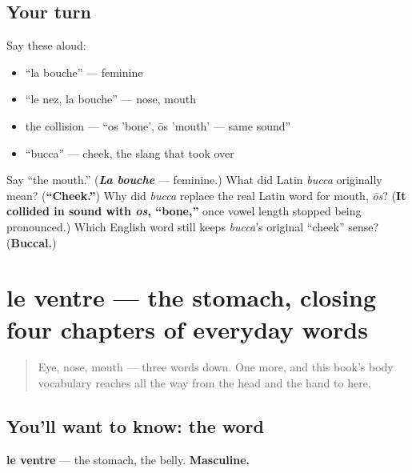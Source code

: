 \subsection*{Your turn}
Say these aloud:

\begin{itemize}
\raggedright
  \item \textquotedblleft{}la bouche\textquotedblright{} — feminine
  \item \textquotedblleft{}le nez, la bouche\textquotedblright{} — nose, mouth
  \item the collision — \textquotedblleft{}os 'bone', ōs 'mouth' — same sound\textquotedblright{}
  \item \textquotedblleft{}bucca\textquotedblright{} — cheek, the slang that took over
\end{itemize}

\begin{tcolorbox}[breakable,colback=teal!4,colframe=teal!35!black,title={Before you move on}]
Say \textquotedblleft{}the mouth.\textquotedblright{} (\emph{\textbf{La bouche}} — feminine.) What did Latin \emph{bucca} originally mean? (\textbf{\textquotedblleft{}Cheek.\textquotedblright{}}) Why did \emph{bucca} replace the real Latin word for mouth, \emph{ōs}? (\textbf{It collided in sound with \emph{os}, \textquotedblleft{}bone,\textquotedblright{}} once vowel length stopped being pronounced.) Which English word still keeps \emph{bucca}'s original \textquotedblleft{}cheek\textquotedblright{} sense? (\textbf{Buccal.})
\end{tcolorbox}
\section[le ventre]{le ventre — the stomach, closing four chapters of everyday words}

\label{lesson:FR-C31-ventre}



\begin{quote}
Eye, nose, mouth — three words down. One more, and this book's body vocabulary reaches all the way from the head and the hand to here.
\end{quote}

\subsection*{You'll want to know: the word}
\textbf{le ventre} — the stomach, the belly. \textbf{Masculine.}

